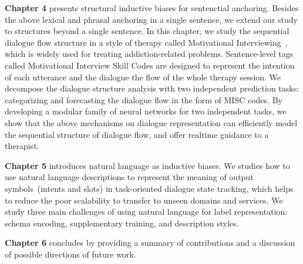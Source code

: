 \textbf{Chapter 4} presents structural inductive biases for
sentenctial anchoring. Besides the above lexical and phrasal anchoring
in a single sentence, we extend our study to structures beyond a
single sentence. In this chapter, we study the sequential dialogue flow
structure in a style of therapy called Motivational
Interviewing~\cite[MI,][]{miller2003motivational,miller2012motivational},
which is widely used for treating addiction-related problems.
Sentence-level tags called Motivational Interview Skill Codes are
designed to represent the intention of each utterance and the dialogue
the flow of the whole therapy session. We decompose the dialogue
structure analysis with two independent prediction tasks: categorizing
and forecasting the dialogue flow in the form of MISC codes. By
developing a modular family of neural networks for two independent
tasks, we show that the above mechanisms on dialogue representation
can efficiently model the sequential structure of dialogue flow, and
offer realtime guidance to a therapist.

\textbf{Chapter 5} introduces natural language as inductive biases. We
studies how to use natural language descriptions to represent the
meaning of output symbols~(intents and slots) in task-oriented dialogue
state tracking, which helps to reduce the poor scalability to transfer
to unseen domains and services. We study three main challenges of
using natural language for label representation: schema encoding,
supplementary training, and description styles.


\textbf{Chapter 6} concludes by providing a summary of contributions
and a discussion of possible directions of future work.

